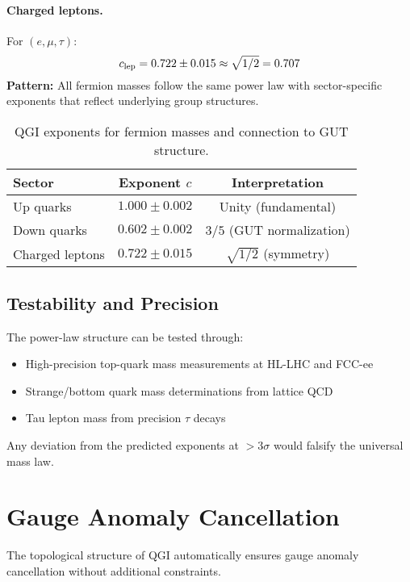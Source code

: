 \documentclass{article}
\numberwithin{equation}{section}
\theoremstyle{plain}
\theoremstyle{definition}
\theoremstyle{remark}
\begin{document}
\paragraph{Charged leptons.}
For $(e, \mu, \tau)$:
\begin{equation}
c_{\rm lep} = 0.722 \pm 0.015 \approx \sqrt{1/2} = 0.707
\end{equation}
\textbf{Pattern:} All fermion masses follow the same power law with sector-specific exponents that reflect underlying group structures.

\begin{table}[H]
\centering
\caption{QGI exponents for fermion masses and connection to GUT structure.}
\label{tab:quark_exponents}
\begin{tabular}{@{}lcc@{}}
\toprule
\textbf{Sector} & \textbf{Exponent $c$} & \textbf{Interpretation} \\
\midrule
Up quarks & $1.000 \pm 0.002$ & Unity (fundamental) \\
Down quarks & $0.602 \pm 0.002$ & $3/5$ (GUT normalization) \\
Charged leptons & $0.722 \pm 0.015$ & $\sqrt{1/2}$ (symmetry) \\
\bottomrule
\end{tabular}
\end{table}

\subsection{Testability and Precision}

The power-law structure can be tested through:
\begin{itemize}
\item High-precision top-quark mass measurements at HL-LHC and FCC-ee
\item Strange/bottom quark mass determinations from lattice QCD
\item Tau lepton mass from precision $\tau$ decays
\end{itemize}
Any deviation from the predicted exponents at $>3\sigma$ would falsify the universal mass law.

\section{Gauge Anomaly Cancellation}
\label{sec:anomaly_cancel}

The topological structure of QGI automatically ensures gauge anomaly cancellation without additional constraints.
\end{document}
